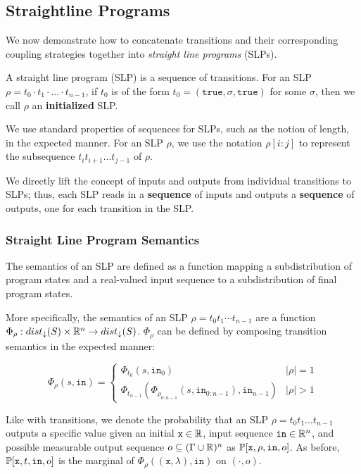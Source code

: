 
\subsection{Straightline Programs}

We now demonstrate how to concatenate transitions and their corresponding coupling strategies together into \textit{straight line programs} (SLPs).

\begin{defn}
    A straight line program (SLP) is a sequence of transitions. For an SLP $\rho = t_0\cdot t_1\cdot\ldots\cdot t_{n-1}$, if $t_0$ is of the form $t_0 = (\texttt{true}, \sigma, \texttt{true})$ for some $\sigma$, then we call $\rho$ an \textbf{initialized} SLP.
\end{defn}

We use standard properties of sequences for SLPs, such as the notion of length, in the expected manner. For an SLP $\rho$, we use the notation $\rho[i:j]$ to represent the subsequence  $t_i t_{i+1} \ldots t_{j-1}$ of $\rho$.

We directly lift the concept of inputs and outputs from individual transitions to SLPs; thus, each SLP reads in a \textbf{sequence} of inputs and outputs a \textbf{sequence} of outputs, one for each transition in the SLP. 

\subsubsection{Straight Line Program Semantics}

The semantics of an SLP are defined as a function mapping a subdistribution of program states and a real-valued input sequence to a subdistribution of final program states. 

More specifically, the semantics of an SLP $\rho = t_0t_1\cdots t_{n-1}$ are a function $\Phi_\rho: dist_\downarrow(S)\times \mathbb{R}^n \to dist_\downarrow(S)$. $\Phi_\rho$ can be defined by composing transition semantics in the expected manner:

\[\Phi_\rho(s, \texttt{in}) = \begin{cases}
    \Phi_{t_0}(s, \texttt{in}_0)& |\rho| = 1\\
    \Phi_{t_{n-1}}(\Phi_{\rho_{0:n-1}}(s, \texttt{in}_{0:n-1}), \texttt{in}_{n-1})& |\rho| >1
\end{cases}\]


Like with transitions, we denote the probability that an SLP $\rho = t_0 t_1\ldots t_{n-1}$ outputs a specific value given an initial $\texttt{x}\in\mathbb{R}$, input sequence $\texttt{in} \in \mathbb{R}^n$, and possible measurable output sequence $o \subseteq (\Gamma\cup\mathbb{R})^n$ as $\mathbb{P}[\texttt{x}, \rho, \texttt{in}, o]$. As before, $\mathbb{P}[\texttt{x}, t, \texttt{in}, o]$ is the marginal of $\Phi_\rho((\texttt{x}, \lambda), \texttt{in})$ on $(\cdot, o)$.

